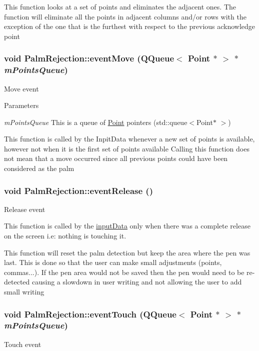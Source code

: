 This function looks at a set of points and eliminates the adjacent ones. The function will eliminate all the points in adjacent columns and/or rows with the exception of the one that is the furthest with respect to the previous acknowledge point \hypertarget{classPalmRejection_ad9bc814545bdb875800c6c4558024310}{
\subsubsection[{eventMove}]{\setlength{\rightskip}{0pt plus 5cm}void PalmRejection::eventMove (QQueue$<$ {\bf Point} $\ast$ $>$ $\ast$ {\em mPointsQueue})}}
\label{classPalmRejection_ad9bc814545bdb875800c6c4558024310}
Move event


\begin{DoxyParams}{Parameters}
\item[{\em mPointsQueue}]This is a queue of \hyperlink{classPoint}{Point} pointers (std::queue$<$Point$\ast$ $>$)\end{DoxyParams}
This function is called by the InpitData whenever a new set of points is available, however not when it is the first set of points available Calling this function does not mean that a move occurred since all previous points could have been considered as the palm \hypertarget{classPalmRejection_a855092ea55c2b5f1025b988d9e77d992}{
\subsubsection[{eventRelease}]{\setlength{\rightskip}{0pt plus 5cm}void PalmRejection::eventRelease ()}}
\label{classPalmRejection_a855092ea55c2b5f1025b988d9e77d992}
Release event

This function is called by the \hyperlink{classinputData}{inputData} only when there was a complete release on the screen i.e: nothing is touching it.

This function will reset the palm detection but keep the area where the pen was last. This is done so that the user can make small adjustments (points, commas...). If the pen area would not be saved then the pen would need to be re-\/detected causing a slowdown in user writing and not allowing the user to add small writing \hypertarget{classPalmRejection_adbd14c99a19d97f2116d1dbc837e4349}{
\subsubsection[{eventTouch}]{\setlength{\rightskip}{0pt plus 5cm}void PalmRejection::eventTouch (QQueue$<$ {\bf Point} $\ast$ $>$ $\ast$ {\em mPointsQueue})}}
\label{classPalmRejection_adbd14c99a19d97f2116d1dbc837e4349}
Touch event


